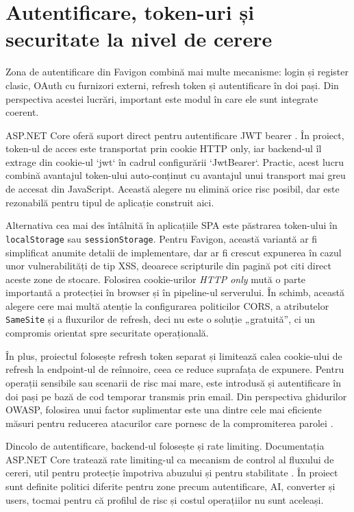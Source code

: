 \section{Autentificare, token-uri și securitate la nivel de cerere}

Zona de autentificare din Favigon combină mai multe mecanisme: login și register clasic, OAuth cu furnizori externi, refresh token și autentificare în doi pași. Din perspectiva acestei lucrări, important este modul în care ele sunt integrate coerent.

ASP.NET Core oferă suport direct pentru autentificare JWT bearer \cite{aspnetJwt2025}. În proiect, token-ul de acces este transportat prin cookie HTTP only, iar backend-ul îl extrage din cookie-ul `jwt` în cadrul configurării `JwtBearer`. Practic, acest lucru combină avantajul token-ului auto-conținut cu avantajul unui transport mai greu de accesat din JavaScript. Această alegere nu elimină orice risc posibil, dar este rezonabilă pentru tipul de aplicație construit aici.

Alternativa cea mai des întâlnită în aplicațiile SPA este păstrarea token-ului în \texttt{localStorage} sau \texttt{sessionStorage}. Pentru Favigon, această variantă ar fi simplificat anumite detalii de implementare, dar ar fi crescut expunerea în cazul unor vulnerabilități de tip XSS, deoarece scripturile din pagină pot citi direct aceste zone de stocare. Folosirea cookie-urilor \textit{HTTP only} mută o parte importantă a protecției în browser și în pipeline-ul serverului. În schimb, această alegere cere mai multă atenție la configurarea politicilor CORS, a atributelor \texttt{SameSite} și a fluxurilor de refresh, deci nu este o soluție „gratuită”, ci un compromis orientat spre securitate operațională.

În plus, proiectul folosește refresh token separat și limitează calea cookie-ului de refresh la endpoint-ul de reînnoire, ceea ce reduce suprafața de expunere. Pentru operații sensibile sau scenarii de risc mai mare, este introdusă și autentificare în doi pași pe bază de cod temporar transmis prin email. Din perspectiva ghidurilor OWASP, folosirea unui factor suplimentar este una dintre cele mai eficiente măsuri pentru reducerea atacurilor care pornesc de la compromiterea parolei \cite{owaspAuth2026,owaspMfa2026}.

Dincolo de autentificare, backend-ul folosește și rate limiting. Documentația ASP.NET Core tratează rate limiting-ul ca mecanism de control al fluxului de cereri, util pentru protecție împotriva abuzului și pentru stabilitate \cite{aspnetRateLimiting2025}. În proiect sunt definite politici diferite pentru zone precum autentificare, AI, converter și users, tocmai pentru că profilul de risc și costul operațiilor nu sunt aceleași.

